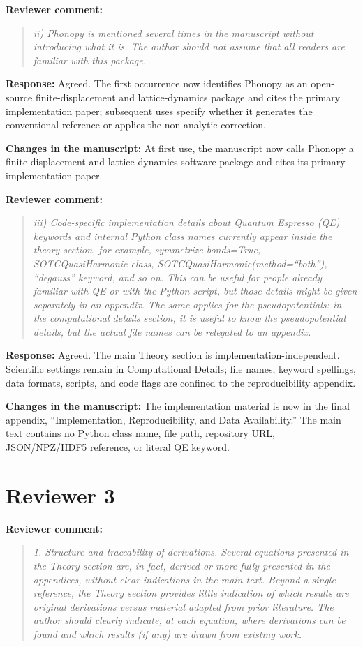 \documentclass[11pt]{article}
\newcommand{\Question}[1]{\par\medskip\noindent\textbf{Reviewer comment:}\par\begin{quote}\itshape #1\end{quote}}
\newcommand{\Answer}[1]{\par\noindent\color{black}\normalfont\textbf{Response:} #1\par\smallskip}
\newcommand{\Change}[1]{\par\noindent\color{revisionblue}\normalfont\textbf{Changes in the manuscript:} #1\par\color{black}\medskip}
\begin{document}
\Question{ii) Phonopy is mentioned several times in the manuscript without introducing what it is. The author should not assume that all readers are familiar with this package.}

\Answer{Agreed. The first occurrence now identifies Phonopy as an open-source
finite-displacement and lattice-dynamics package and cites the primary
implementation paper; subsequent uses specify whether it generates the
conventional reference or applies the non-analytic correction.}

\Change{At first use, the manuscript now calls Phonopy a finite-displacement and lattice-dynamics software package and cites its primary implementation paper.}

\Question{iii) Code-specific implementation details about Quantum Espresso (QE) keywords and internal Python class names currently appear inside the theory section, for example, symmetrize bonds=True, SOTCQuasiHarmonic class, SOTCQuasiHarmonic(method=\textquotedblleft{}both''), \textquotedblleft{}degauss'' keyword, and so on. This can be useful for people already familiar with QE or with the Python script, but those details might be given separately in an appendix. The same applies for the pseudopotentials: in the computational details section, it is useful to know the pseudopotential details, but the actual file names can be relegated to an appendix.}

\Answer{Agreed. The main Theory section is implementation-independent. Scientific settings remain in Computational Details; file names, keyword spellings, data formats, scripts, and code flags are confined to the reproducibility appendix.}

\Change{The implementation material is now in the final appendix, ``Implementation, Reproducibility, and Data Availability.'' The main text contains no Python class name, file path, repository URL, JSON/NPZ/HDF5 reference, or literal QE keyword.}

\section*{Reviewer 3}

\Question{1. Structure and traceability of derivations. Several equations presented in the Theory section are, in fact, derived or more fully presented in the appendices, without clear indications in the main text. Beyond a single reference, the Theory section provides little indication of which results are original derivations versus material adapted from prior literature. The author should clearly indicate, at each equation, where derivations can be found and which results (if any) are drawn from existing work.}
\end{document}

